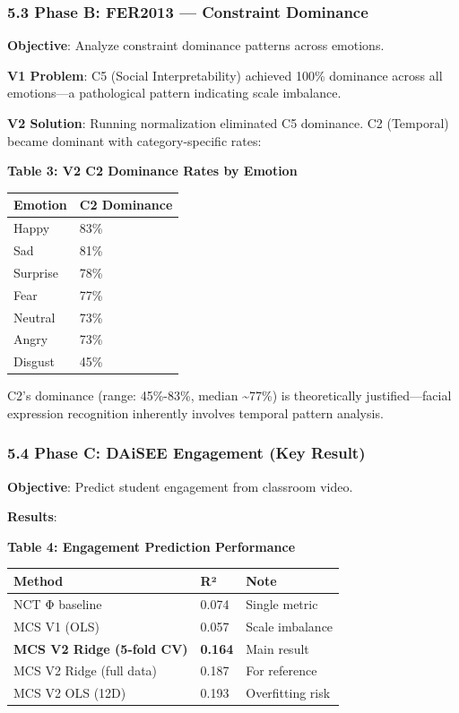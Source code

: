 \documentclass[
]{article}
\newcounter{none} %
\begin{document}
\subsubsection{5.3 Phase B: FER2013 --- Constraint
Dominance}\label{phase-b-fer2013-constraint-dominance}

\textbf{Objective}: Analyze constraint dominance patterns across
emotions.

\textbf{V1 Problem}: C5 (Social Interpretability) achieved 100\%
dominance across all emotions---a pathological pattern indicating scale
imbalance.

\textbf{V2 Solution}: Running normalization eliminated C5 dominance. C2
(Temporal) became dominant with category-specific rates:

\textbf{Table 3: V2 C2 Dominance Rates by Emotion}

{\def\LTcaptype{none} %
\begin{longtable}[]{@{}ll@{}}
\toprule\noalign{}
Emotion & C2 Dominance \\
\midrule\noalign{}
\endhead
\bottomrule\noalign{}
\endlastfoot
Happy & 83\% \\
Sad & 81\% \\
Surprise & 78\% \\
Fear & 77\% \\
Neutral & 73\% \\
Angry & 73\% \\
Disgust & 45\% \\
\end{longtable}
}

C2's dominance (range: 45\%-83\%, median \textasciitilde77\%) is
theoretically justified---facial expression recognition inherently
involves temporal pattern analysis.

\subsubsection{5.4 Phase C: DAiSEE Engagement (Key
Result)}\label{phase-c-daisee-engagement-key-result}

\textbf{Objective}: Predict student engagement from classroom video.

\textbf{Results}:

\textbf{Table 4: Engagement Prediction Performance}

{\def\LTcaptype{none} %
\begin{longtable}[]{@{}lll@{}}
\toprule\noalign{}
Method & R² & Note \\
\midrule\noalign{}
\endhead
\bottomrule\noalign{}
\endlastfoot
NCT Φ baseline & 0.074 & Single metric \\
MCS V1 (OLS) & 0.057 & Scale imbalance \\
\textbf{MCS V2 Ridge (5-fold CV)} & \textbf{0.164} & Main result \\
MCS V2 Ridge (full data) & 0.187 & For reference \\
MCS V2 OLS (12D) & 0.193 & Overfitting risk \\
\end{longtable}
}
\end{document}
